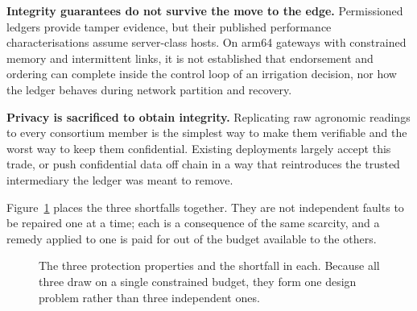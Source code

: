 \documentclass[12pt,a4paper,oneside]{book}
\begin{document}
\textbf{Integrity guarantees do not survive the move to the edge.} Permissioned
ledgers provide tamper evidence, but their published performance
characterisations assume server-class hosts. On \gls{arm64} gateways with
constrained memory and intermittent links, it is not established that
endorsement and ordering can complete inside the control loop of an irrigation
decision, nor how the ledger behaves during network partition and recovery.

\textbf{Privacy is sacrificed to obtain integrity.} Replicating raw agronomic
readings to every consortium member is the simplest way to make them verifiable
and the worst way to keep them confidential. Existing deployments largely accept
this trade, or push confidential data off chain in a way that reintroduces the
trusted intermediary the ledger was meant to remove.

Figure~\ref{fig:three-properties} places the three shortfalls together. They are
not independent faults to be repaired one at a time; each is a consequence of
the same scarcity, and a remedy applied to one is paid for out of the budget
available to the others.

\begin{figure}[htbp]
  \centering
  \caption{The three protection properties and the shortfall in each. Because
           all three draw on a single constrained budget, they form one design
           problem rather than three independent ones.}
  \label{fig:three-properties}
\end{figure}
\end{document}
